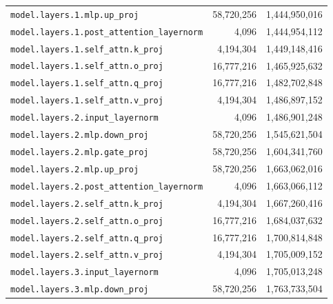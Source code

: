\documentclass[10pt,a4paper]{article}
\theoremstyle{definition}
\begin{document}
\begin{appendices}
\begin{longtable}{p{9.5cm}rr}
\texttt{model.\allowbreak{}layers.\allowbreak{}1.\allowbreak{}mlp.\allowbreak{}up\_proj} & 58,720,256 & 1,444,950,016 \\
\texttt{model.\allowbreak{}layers.\allowbreak{}1.\allowbreak{}post\_attention\_layernorm} & 4,096 & 1,444,954,112 \\
\texttt{model.\allowbreak{}layers.\allowbreak{}1.\allowbreak{}self\_attn.\allowbreak{}k\_proj} & 4,194,304 & 1,449,148,416 \\
\texttt{model.\allowbreak{}layers.\allowbreak{}1.\allowbreak{}self\_attn.\allowbreak{}o\_proj} & 16,777,216 & 1,465,925,632 \\
\texttt{model.\allowbreak{}layers.\allowbreak{}1.\allowbreak{}self\_attn.\allowbreak{}q\_proj} & 16,777,216 & 1,482,702,848 \\
\texttt{model.\allowbreak{}layers.\allowbreak{}1.\allowbreak{}self\_attn.\allowbreak{}v\_proj} & 4,194,304 & 1,486,897,152 \\
\texttt{model.\allowbreak{}layers.\allowbreak{}2.\allowbreak{}input\_layernorm} & 4,096 & 1,486,901,248 \\
\texttt{model.\allowbreak{}layers.\allowbreak{}2.\allowbreak{}mlp.\allowbreak{}down\_proj} & 58,720,256 & 1,545,621,504 \\
\texttt{model.\allowbreak{}layers.\allowbreak{}2.\allowbreak{}mlp.\allowbreak{}gate\_proj} & 58,720,256 & 1,604,341,760 \\
\texttt{model.\allowbreak{}layers.\allowbreak{}2.\allowbreak{}mlp.\allowbreak{}up\_proj} & 58,720,256 & 1,663,062,016 \\
\texttt{model.\allowbreak{}layers.\allowbreak{}2.\allowbreak{}post\_attention\_layernorm} & 4,096 & 1,663,066,112 \\
\texttt{model.\allowbreak{}layers.\allowbreak{}2.\allowbreak{}self\_attn.\allowbreak{}k\_proj} & 4,194,304 & 1,667,260,416 \\
\texttt{model.\allowbreak{}layers.\allowbreak{}2.\allowbreak{}self\_attn.\allowbreak{}o\_proj} & 16,777,216 & 1,684,037,632 \\
\texttt{model.\allowbreak{}layers.\allowbreak{}2.\allowbreak{}self\_attn.\allowbreak{}q\_proj} & 16,777,216 & 1,700,814,848 \\
\texttt{model.\allowbreak{}layers.\allowbreak{}2.\allowbreak{}self\_attn.\allowbreak{}v\_proj} & 4,194,304 & 1,705,009,152 \\
\texttt{model.\allowbreak{}layers.\allowbreak{}3.\allowbreak{}input\_layernorm} & 4,096 & 1,705,013,248 \\
\texttt{model.\allowbreak{}layers.\allowbreak{}3.\allowbreak{}mlp.\allowbreak{}down\_proj} & 58,720,256 & 1,763,733,504 \\

\end{longtable}
\end{appendices}
\end{document}
